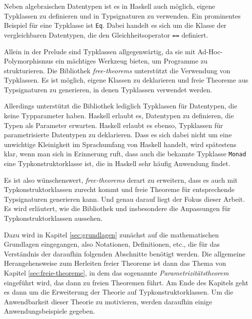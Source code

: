 
Neben algebraischen Datentypen ist es in Haskell auch möglich, eigene Typklassen zu definieren und in
Typsignaturen zu verwenden. Ein prominentes Beispiel für eine Typklasse ist \texttt{Eq}. Dabei handelt es sich um
die Klasse der vergleichbaren Datentypen, die den Gleichheitsoperator \texttt{==} definiert.

Allein in der Prelude sind Typklassen allgegenwärtig, da sie mit Ad-Hoc-Poly\-mor\-phis\-mus ein mächtiges Werkzeug bieten,
um Programme zu strukturieren. Die Bibliothek \textit{free-theorems} unterstützt die Verwendung von Typklassen. Es ist möglich, eigene
Klassen zu deklarieren und freie Theoreme aus Typsignaturen zu generieren, in denen Typklassen verwendet werden.

Allerdings unterstützt die Bibliothek lediglich Typklassen für Datentypen, die keine Typparameter haben. Haskell erlaubt es,
Datentypen zu definieren, die Typen als Parameter erwarten. Haskell erlaubt es ebenso, Typklassen für parametrisierte
Datentypen zu deklarieren. Dass es sich dabei nicht um eine unwichtige Kleinigkeit im Sprachumfang von Haskell handelt, wird spätestens klar, wenn man
sich in Erinnerung ruft, dass auch die bekannte Typklasse \texttt{Monad} eine Typkonstruktorklasse ist, die in Haskell sehr häufig
Anwendung findet.

Es ist also wünschenswert, \textit{free-theorems} derart zu erweitern, dass es auch mit Typkonstruktorklassen zurecht kommt und
freie Theoreme für entsprechende Typsignaturen generieren kann. Und genau darauf liegt der Fokus dieser Arbeit. Es wird
erläutert, wie die Bibliothek und insbesondere die Anpassungen für Typkonstruktorklassen aussehen.

Dazu wird in Kapitel \ref{sec:grundlagen} zunächst auf die mathematischen Grundlagen eingegangen, also Notationen, Definitionen,
etc., die für das Verständnis der daraufhin folgenden Abschnitte benötigt werden.
Die allgemeine Herangehensweise zum Herleiten freier Theoreme ist dann das Thema von Kapitel \ref{sec:freie-theoreme}, in dem
das sogenannte \textit{Parametrizitätstheorem} eingeführt wird, das dann zu freien Theoremen führt.
Am Ende des Kapitels geht es dann um die Erweiterung der Theorie auf Typkonstruktorklassen. Um die Anwendbarkeit dieser
Theorie zu motivieren, werden daraufhin einige Anwendungsbeispiele gegeben.

